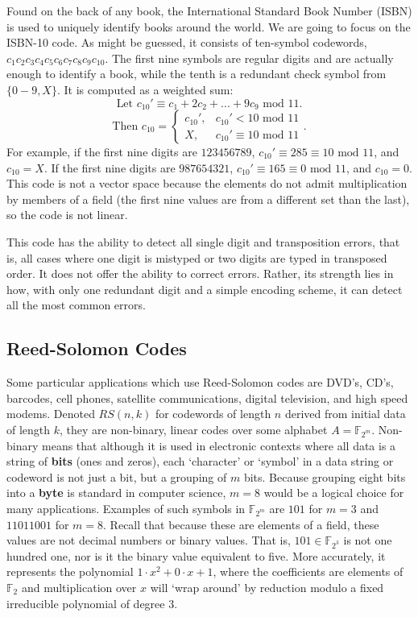\documentclass[11pt]{article}
\newcommand{\F}{\mathbb{F}}
\begin{document}
Found on the back of any book, the International Standard Book Number (ISBN) is used to uniquely identify books around the world. We are going to focus on the ISBN-10 code. As might be guessed, it consists of ten-symbol codewords, $c_{1}c_{2}c_{3}c_{4}c_{5}c_{6}c_{7}c_{8}c_{9}c_{10}$. The first nine symbols are regular digits and are actually enough to identify a book, while the tenth is a redundant check symbol from $\{0-9,X\}$. It is computed as a weighted sum:
\[\text{Let }c_{10}' \equiv c_{1}+2c_{2}+...+9c_{9}\text{ mod }11.\]
\[
\text{Then }c_{10} =
  \begin{cases}
  c_{10}', & c_{10}'<10\text{ mod }11 \\
  X, & c_{10}'\equiv10\text{ mod }11
  \end{cases}
.
\]
For example, if the first nine digits are $123456789$, $c_{10}' \equiv 285 \equiv 10\text{ mod }11$, and $c_{10}=X$. If the first nine digits are $987654321$, $c_{10}' \equiv 165 \equiv 0\text{ mod }11$, and $c_{10}=0$. This code is not a vector space because the elements do not admit multiplication by members of a field (the first nine values are from a different set than the last), so the code is not linear.

This code has the ability to detect all single digit and transposition errors, that is, all cases where one digit is mistyped or two digits are typed in transposed order. It does not offer the ability to correct errors. Rather, its strength lies in how, with only one redundant digit and a simple encoding scheme, it can detect all the most common errors. \cite[4]{codesandcurves}

\subsection{Reed-Solomon Codes}

Some particular applications which use Reed-Solomon codes are DVD's, CD's, barcodes, cell phones, satellite communications, digital television, and high speed modems. \cite{reedsolomoncodes} Denoted $RS(n,k)$ for codewords of length $n$ derived from initial data of length $k$, they are non-binary, linear codes over some alphabet $A = \F_{2^{m}}$. Non-binary means that although it is used in electronic contexts where all data is a string of \textbf{bits} (ones and zeros), each `character' or `symbol' in a data string or codeword is not just a bit, but a grouping of $m$ bits. Because grouping eight bits into a \textbf{byte} is standard in computer science, $m=8$ would be a logical choice for many applications. Examples of such symbols in $\F_{2^{m}}$ are $101$ for $m=3$ and $11011001$ for $m=8$. Recall that because these are elements of a field, these values are not decimal numbers or binary values. That is, $101 \in \F_{2^{3}}$ is not one hundred one, nor is it the binary value equivalent to five. More accurately, it represents the polynomial $1\cdot x^{2} + 0\cdot x + 1$, where the coefficients are elements of $\F_{2}$ and multiplication over $x$ will `wrap around' by reduction modulo a fixed irreducible polynomial of degree $3$.
\end{document}
